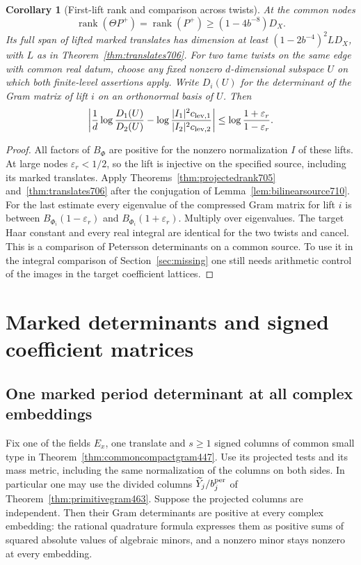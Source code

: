 \documentclass[a4paper,11pt]{article}
\newtheorem{corollary}[proposition]{Corollary}
\theoremstyle{definition}
\theoremstyle{remark}
\numberwithin{equation}{section}
\begin{document}
\begin{corollary}[First-lift rank and comparison across twists]\leavevmode
\label{cor:firstliftrank711}
At the common nodes
\[
   \operatorname{rank}(\Theta P^+)
          =\operatorname{rank}(P^+)\ge(1-4b^{-8})D_X .
\]
Its full span of lifted marked translates has dimension
at least \((1-2b^{-4})^2 L D_X\), with \(L\) as in
Theorem~\ref{thm:translates706}. For two tame twists
on the same edge with common real datum, choose any fixed
nonzero \(d\)-dimensional subspace \(U\) on which both
finite-level assertions apply. Write \(D_i(U)\) for
the determinant of the Gram matrix of lift \(i\) on an
orthonormal basis of \(U\). Then
\[
 \left|\frac1d\log\frac{D_1(U)}{D_2(U)}
       -\log\frac{|I_1|^2c_{{\rm lev},1}}
                      {|I_2|^2c_{{\rm lev},2}}\right|
 \le\log\frac{1+\varepsilon_r}{1-\varepsilon_r}.
\]
\end{corollary}
\begin{proof}
All factors of \(B_\Phi\) are positive for the nonzero
normalization \(I\) of these lifts. At large nodes
\(\varepsilon_r<1/2\), so the lift is injective on the
specified source, including its marked translates. Apply
Theorems~\ref{thm:projectedrank705} and~\ref{thm:translates706}
after the conjugation of Lemma~\ref{lem:bilinearsource710}.
For the last estimate every eigenvalue of the compressed
Gram matrix for lift \(i\) is between \(B_{\Phi_i}
(1-\varepsilon_r)\) and \(B_{\Phi_i}(1+\varepsilon_r)\).
Multiply over eigenvalues. The target Haar constant and
every real integral are identical for the two twists and
cancel. This is a comparison of Petersson determinants
on a common source. To use it in the integral comparison
of Section~\ref{sec:missing} one still needs arithmetic
control of the images in the target coefficient lattices.
\end{proof}

\section{Marked determinants and signed coefficient matrices}\label{nav:chapter-marked-period-determinants}

\subsection{One marked period determinant at all complex embeddings}
\label{sec:allplacesminor477}

Fix one of the fields \(E_x\), one translate and \(s\ge1\) signed
columns of common small type in Theorem~\ref{thm:commoncompactgram447}.
Use its projected tests and its mass metric, including the same
normalization of the columns on both sides. In particular one may
use the divided columns \(\widetilde Y_j/b_j^{\rm per}\) of
Theorem~\ref{thm:primitivegram463}. Suppose the projected columns
are independent. Then their Gram determinants are positive at
every complex embedding: the rational quadrature formula expresses
them as positive sums of squared absolute values of algebraic
minors, and a nonzero minor stays nonzero at every embedding.
\end{document}
